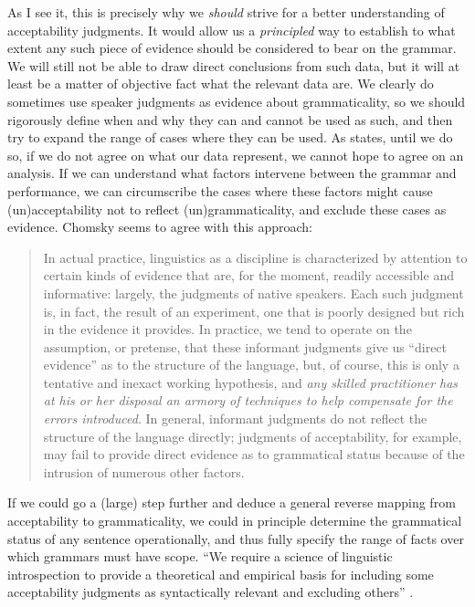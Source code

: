 As I see it, this is precisely why we \textit{should} strive for a better understanding of acceptability judgments. It would allow us a \textit{principled} way to establish to what extent any such piece of evidence should be considered to bear on the grammar. We will still not be able to draw direct conclusions from such data, but it will at least be a matter of objective fact what the relevant data are. We clearly do sometimes use speaker judgments as evidence about grammaticality, so we should rigorously define when and why they can and cannot be used as such, and then try to expand the range of cases where they can be used. As \citet{Birdsong1989} states, until we do so, if we do not agree on what our data represent, we cannot hope to agree on an analysis. If we can understand what factors intervene between the grammar and performance, we can circumscribe the cases where these factors might cause (un)acceptability not to reflect (un)grammaticality, and exclude these cases as evidence. Chomsky seems to agree with this approach:

\begin{quote}
In actual practice, linguistics as a discipline is characterized by attention to certain kinds of evidence that are, for the moment, readily accessible and informative: largely, the judgments of native speakers. Each such judgment is, in fact, the result of an experiment, one that is poorly designed but rich in the evidence it provides. In practice, we tend to operate on the assumption, or pretense, that these informant judgments give us ``direct evidence'' as to the structure of the language, but, of course, this is only a tentative and inexact working hypothesis, and \textit{any skilled practitioner has at his or her disposal an armory of techniques to help compensate for the errors introduced}. In general, informant judgments do not reflect the structure of the language directly; judgments of acceptability, for example, may fail to provide direct evidence as to grammatical status because of the intrusion of numerous other factors. \citep[36]{Chomsky1986}
\end{quote}

\noindent
If we could go a (large) step further and deduce a general reverse mapping from acceptability to grammaticality, we could in principle determine the grammatical status of any sentence operationally, and thus fully specify the range of facts over
which grammars must have scope. ``We require a science of linguistic introspection to provide a theoretical and empirical basis for including some acceptability judgments as syntactically relevant and excluding others'' \citep[195]{Bever1974}.

